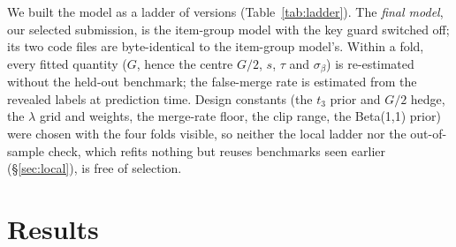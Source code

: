 \documentclass{article}
\begin{document}
We built the model as a ladder of versions (Table~\ref{tab:ladder}). The \emph{final model}, our selected submission, is the
item-group model with the key guard switched off; its two code files are byte-identical to the item-group model's.
Within a fold, every fitted quantity ($G$, hence the centre $G/2$, $s$, $\tau$ and $\sigma_\beta$) is re-estimated
without the held-out benchmark; the false-merge rate is estimated from the revealed labels at prediction time. Design
constants (the $t_3$ prior and $G/2$ hedge, the $\lambda$ grid and weights, the merge-rate floor, the clip range,
the Beta(1,1) prior) were chosen with the four folds visible, so neither the local ladder nor the out-of-sample check, which refits nothing but reuses benchmarks seen earlier (\S\ref{sec:local}), is free of selection.

\section{Results}\label{sec:results}
\end{document}
